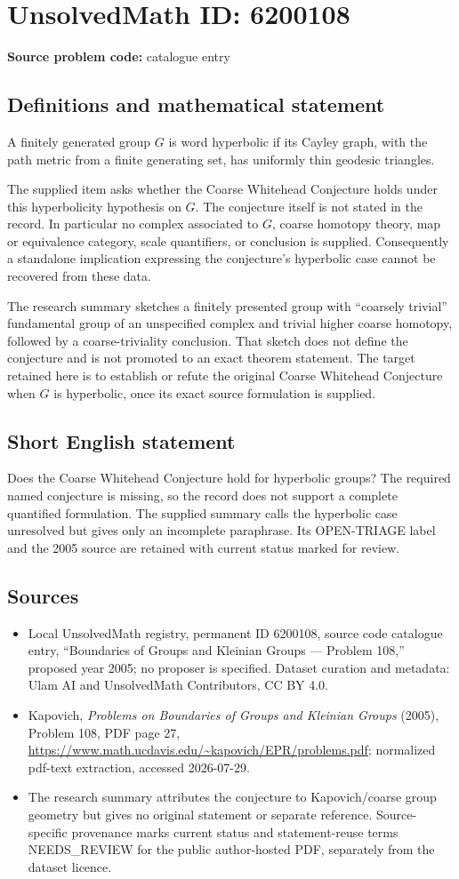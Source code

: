 \documentclass[11pt]{article}
\begin{document}
\section*{UnsolvedMath ID: 6200108}
\textbf{Source problem code:} catalogue entry
\subsection{Definitions and mathematical statement}
A finitely generated group $G$ is word hyperbolic if its Cayley graph, with the path metric from a finite generating set, has uniformly thin geodesic triangles.

The supplied item asks whether the Coarse Whitehead Conjecture holds under this hyperbolicity hypothesis on $G$. The conjecture itself is not stated in the record. In particular no complex associated to $G$, coarse homotopy theory, map or equivalence category, scale quantifiers, or conclusion is supplied. Consequently a standalone implication expressing the conjecture's hyperbolic case cannot be recovered from these data.

The research summary sketches a finitely presented group with ``coarsely trivial'' fundamental group of an unspecified complex and trivial higher coarse homotopy, followed by a coarse-triviality conclusion. That sketch does not define the conjecture and is not promoted to an exact theorem statement. The target retained here is to establish or refute the original Coarse Whitehead Conjecture when $G$ is hyperbolic, once its exact source formulation is supplied.
\subsection{Short English statement}
Does the Coarse Whitehead Conjecture hold for hyperbolic groups? The required named conjecture is missing, so the record does not support a complete quantified formulation. The supplied summary calls the hyperbolic case unresolved but gives only an incomplete paraphrase. Its OPEN-TRIAGE label and the 2005 source are retained with current status marked for review.
\subsection{Sources}
\begin{itemize}
\item Local UnsolvedMath registry, permanent ID 6200108, source code catalogue entry, ``Boundaries of Groups and Kleinian Groups --- Problem 108,'' proposed year 2005; no proposer is specified. Dataset curation and metadata: Ulam AI and UnsolvedMath Contributors, CC BY 4.0.
\item Kapovich, \emph{Problems on Boundaries of Groups and Kleinian Groups} (2005), Problem 108, PDF page 27, \url{https://www.math.ucdavis.edu/~kapovich/EPR/problems.pdf}; normalized pdf-text extraction, accessed 2026-07-29.
\item The research summary attributes the conjecture to Kapovich/coarse group geometry but gives no original statement or separate reference. Source-specific provenance marks current status and statement-reuse terms NEEDS\_REVIEW for the public author-hosted PDF, separately from the dataset licence.
\end{itemize}
\end{document}
